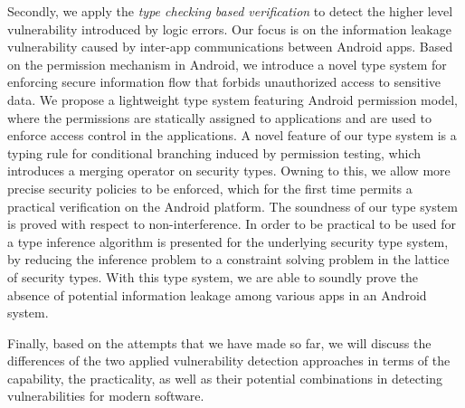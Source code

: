 Secondly, we apply the \emph{type checking based verification} to detect the higher level vulnerability introduced by logic errors. Our focus is on the information leakage vulnerability caused by inter-app communications between Android apps. Based on the permission mechanism in Android, we introduce a novel type system for enforcing secure information flow that forbids unauthorized access to sensitive data. We propose a lightweight type system featuring Android permission model, where the permissions are statically assigned to applications and are used to enforce access control in the applications. A novel feature of our type system is a typing rule for conditional branching induced by permission testing, which introduces a merging operator on security types. Owning to this, we allow more precise security policies to be enforced, which for the first time permits a practical verification on the Android platform. The soundness of our type system is proved with respect to non-interference. In order to be practical to be used for  a type inference algorithm is presented for the underlying security type system, by reducing the inference problem to a constraint solving problem in the lattice of security types. 
With this type system, we are able to soundly prove the absence of potential information leakage among various apps in an Android system.

Finally, based on the attempts that we have made so far, we will discuss the differences of the two applied vulnerability detection approaches in terms of the capability, the practicality, as well as their potential combinations in detecting vulnerabilities for modern software.






